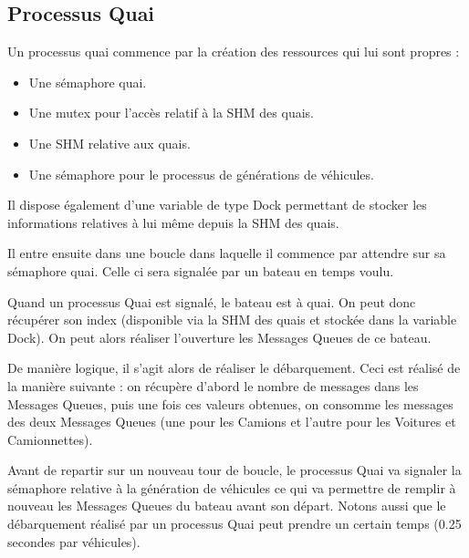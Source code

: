 \documentclass[a4paper, 11pt]{article}
\begin{document}
	\subsection{Processus Quai}
		Un processus quai commence par la création des ressources qui lui sont propres : 
		\begin{itemize}
			\item Une sémaphore quai.
			\item Une mutex pour l'accès relatif à la SHM des quais.
			\item Une SHM relative aux quais.
			\item Une sémaphore pour le processus de générations de véhicules.
		\end{itemize}
		Il dispose également d'une variable de type Dock permettant de stocker les informations relatives à lui même depuis la SHM des quais.
		
		Il entre ensuite dans une boucle dans laquelle il commence par attendre sur sa sémaphore quai. Celle ci sera signalée par un bateau en temps voulu.
		
		Quand un processus Quai est signalé, le bateau est à quai. On peut donc récupérer son index (disponible via la SHM des quais et stockée dans la variable Dock). On peut alors réaliser l'ouverture les Messages Queues de ce bateau.
		
		De manière logique, il s'agit alors de réaliser le débarquement. Ceci est réalisé de la manière suivante : on récupère d'abord le nombre de messages dans les Messages Queues, puis une fois ces valeurs obtenues, on consomme les messages des deux Messages Queues (une pour les Camions et l'autre pour les Voitures et Camionnettes).
		
		
		Avant de repartir sur un nouveau tour de boucle, le processus Quai va signaler la sémaphore relative à la génération de véhicules ce qui va permettre de remplir à nouveau les Messages Queues du bateau avant son départ. Notons aussi que le débarquement réalisé par un processus Quai peut prendre un certain temps (0.25 secondes par véhicules).
		
		
		
\end{document}
